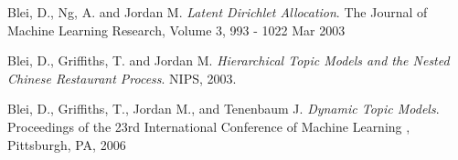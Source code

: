 \documentclass[DIV=calc, paper=letter, fontsize=10pt, twocolumn]{scrartcl}	 %
\begin{document}
\begin{thebibliography}{99}

  Blei, D., Ng, A. and Jordan M.
  \emph{Latent Dirichlet Allocation}.
  The Journal of Machine Learning Research,
 Volume 3, 993 - 1022
 Mar 2003
 
  Blei, D., Griffiths, T. and Jordan M.
  \emph{Hierarchical Topic Models and the Nested Chinese Restaurant Process}.
  NIPS,
 2003.
 
  Blei, D., Griffiths, T., Jordan M., and Tenenbaum J. 
  \emph{Dynamic Topic Models}.
  Proceedings of the 23rd International Conference of Machine Learning ,
 Pittsburgh, PA,
 2006
 
 
\end{thebibliography}
\end{document}
